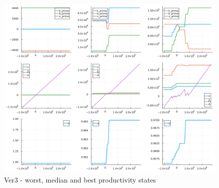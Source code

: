 \documentclass[12pt]{article}
\begin{document}
\begin{figure}[H]  %
    \centering
    \caption{Ver3 - worst, median and best productivity states} \label{chart:CFLcdf}
    \includegraphics[width=1\textwidth]{ver3.png}
\end{figure}

\newpage
\setcounter{equation}{0}
\end{document}
